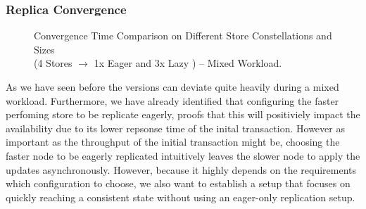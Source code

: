 

\subsubsection{Replica Convergence} 



\begin{figure}[t] 
    \centering 
    \caption{Convergence Time Comparison on Different Store Constellations and Sizes\\(4 Stores $\rightarrow$ 1x Eager and 3x Lazy ) -- Mixed Workload.}
    \label{fig:store_comparision}
\end{figure}

As we have seen before the versions can deviate quite heavily during a mixed workload. 
Furthermore, we have already identified that configuring the faster perfoming store to be replicate eagerly, proofs that this will positiviely impact 
the availability due to its lower repsonse time of the inital transaction.
However as important as the throughput of the initial transaction might be, choosing the faster node to be eagerly replicated intuitively leaves the slower node
to apply the updates asynchronously. 
However, because it highly depends on the requirements which configuration to choose, we also want to establish a setup that focuses on quickly reaching
a consistent state without using an eager-only replication setup.



